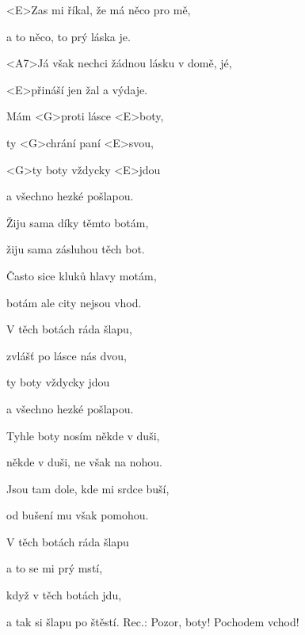 

\zs
<E>Zas mi říkal, že má něco pro mě,

a to něco, to prý láska je.

<A7>Já však nechci žádnou lásku v domě, jé,

<E>přináší jen žal a výdaje.

Mám <G>proti lásce <E>boty,

ty <G>chrání paní <E>svou,

<G>ty boty vždycky <E>jdou

a všechno hezké pošlapou.
\ks

\zs
Žiju sama díky těmto botám,

žiju sama zásluhou těch bot.

Často sice kluků hlavy motám,

botám ale city nejsou vhod.

V těch botách ráda šlapu,

zvlášť po lásce nás dvou,

ty boty vždycky jdou

a všechno hezké pošlapou.
\ks

\zs
Tyhle boty nosím někde v duši,

někde v duši, ne však na nohou.

Jsou tam dole, kde mi srdce buší,

od bušení mu však pomohou.

V těch botách ráda šlapu

a to se mi prý mstí,

když v těch botách jdu,

a tak si šlapu po štěstí. Rec.: Pozor, boty! Pochodem vchod!
\ks

\kp
